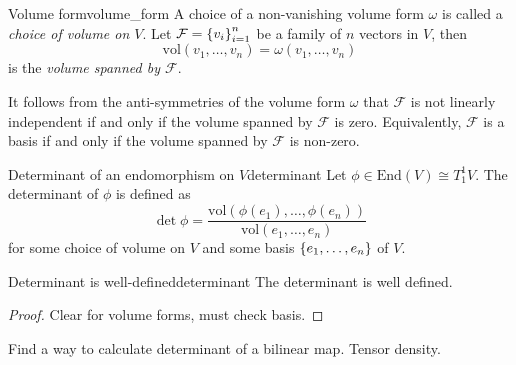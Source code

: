\begin{definition}{Volume form}{volume_form}
    A choice of a non-vanishing volume form \(\omega\) is called a \emph{choice of volume on \(V\)}. Let \(\mathcal{F} = \left\{v_i\right\}_{i=1}^{n}\) be a family of \(n\) vectors in \(V\), then
    \begin{equation*}
        \mathrm{vol}(v_1, \dots, v_n) = \omega(v_1, \dots, v_n)
    \end{equation*}
    is the \emph{volume spanned by \(\mathcal{F}\)}.
\end{definition}
\begin{remark}
    It follows from the anti-symmetries of the volume form \(\omega\) that \(\mathcal{F}\) is not linearly independent if and only if the volume spanned by \(\mathcal{F}\) is zero. Equivalently, \(\mathcal{F}\) is a basis if and only if the volume spanned by \(\mathcal{F}\) is non-zero.
\end{remark}

\begin{definition}{Determinant of an endomorphism on \(V\)}{determinant}
    Let \(\phi \in \mathrm{End}(V) \cong T_1^1 V\). The determinant of \(\phi\) is defined as
    \begin{equation*}
        \det \phi = \frac{\mathrm{vol}(\phi(e_1), \dots, \phi(e_n))}{\mathrm{vol}(e_1, \dots, e_n)}
    \end{equation*}
    for some choice of volume on \(V\) and some basis \(\{e_1, \dots, e_n\}\) of \(V\).
\end{definition}

\begin{proposition}{Determinant is well-defined}{determinant}
    The determinant is well defined.
\end{proposition}
\begin{proof}
    Clear for volume forms, must check basis.
\end{proof}

Find a way to calculate determinant of a bilinear map. Tensor density.


